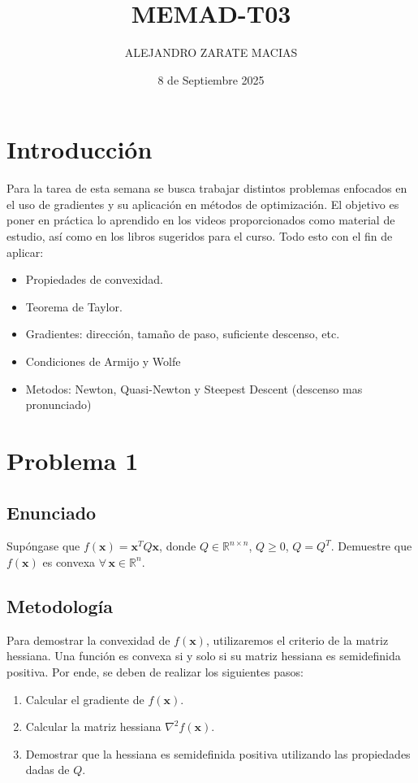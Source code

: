 \documentclass{article}
\title{MEMAD-T03}
\author{ALEJANDRO ZARATE MACIAS}
\date{8 de Septiembre 2025}
\begin{document}
\maketitle

\section*{Introducción}
Para la tarea de esta semana se busca trabajar distintos problemas enfocados en el uso de gradientes y su aplicación en métodos de optimización. El objetivo es poner en práctica lo aprendido en los videos proporcionados como material de estudio, así como en los libros sugeridos para el curso. Todo esto con el fin de aplicar:

\begin{itemize}
    \item Propiedades de convexidad.
    \item Teorema de Taylor.
    \item Gradientes: dirección, tamaño de paso, suficiente descenso, etc.
    \item Condiciones de Armijo y Wolfe
    \item Metodos: Newton, Quasi-Newton y Steepest Descent (descenso mas pronunciado)
\end{itemize}
\section{Problema 1}

\subsection{Enunciado}
Supóngase que $f(\mathbf{x}) = \mathbf{x}^T Q \mathbf{x}$, donde $Q \in \mathbb{R}^{n \times n}$, $Q \geq 0$, $Q = Q^T$. Demuestre que $f(\mathbf{x})$ es convexa $\forall \, \mathbf{x} \in \mathbb{R}^n$.

\subsection{Metodología}

Para demostrar la convexidad de $f(\mathbf{x})$, utilizaremos el criterio de la matriz hessiana. Una función es convexa si y solo si su matriz hessiana es semidefinida positiva. Por ende, se deben de realizar los siguientes pasos:
\begin{enumerate}
    \item Calcular el gradiente de $f(\mathbf{x})$.
    \item Calcular la matriz hessiana $\nabla^2 f(\mathbf{x})$.
    \item Demostrar que la hessiana es semidefinida positiva utilizando las propiedades dadas de $Q$.
\end{enumerate}
\end{document}
